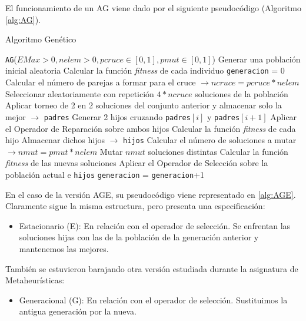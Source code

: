 El funcionamiento de un AG viene dado por el siguiente pseudocódigo (Algoritmo \ref{alg:AG}).

\begin{algorithm}
\caption{Algoritmo Genético}\label{alg:AG}
\begin{algorithmic}[1]
\Procedure \texttt{AG}($EMax > 0, nelem > 0, pcruce \in [0,1], pmut \in [0,1]$)
\State Generar una población inicial aleatoria
\State Calcular la función \textit{fitness} de cada individuo
\State \texttt{generacion} = 0
	\State Calcular el número de parejas a formar para el cruce $\xrightarrow{}{} ncruce = pcruce*nelem$
	\State Seleccionar aleatoriamente con repetición $4*ncruce$ soluciones de la población
	\State Aplicar torneo de 2 en 2 soluciones del conjunto anterior y almacenar solo la mejor $\xrightarrow{}{}$ \texttt{padres}
		\State Generar 2 hijos cruzando \texttt{padres}$[i]$ y \texttt{padres}$[i+1]$
		\State Aplicar el Operador de Reparación sobre ambos hijos
		\State Calcular la función \textit{fitness} de cada hijo
		\State Almacenar dichos hijos $\xrightarrow{}{}$ \texttt{hijos}
	\EndFor	
	\State Calcular el número de soluciones a mutar $\xrightarrow{}{} nmut = pmut*nelem$
	\State Mutar $nmut$ soluciones distintas
	\State Calcular la función \textit{fitness} de las nuevas soluciones
	\State Aplicar el Operador de Selección sobre la población actual e \texttt{hijos}
	\State \texttt{generacion} = \texttt{generacion}+1
\EndWhile
\EndProcedure
\end{algorithmic}
\end{algorithm}

En el caso de la versión AGE, su pseudocódigo viene representado en \ref{alg:AGE}. 
Claramente sigue la misma estructura, pero presenta una especificación:
\begin{itemize}
	\item Estacionario (E): En relación con el operador de selección. 
Se enfrentan las soluciones hijas con las de la población de la generación anterior y mantenemos las mejores. 
\end{itemize}
También se estuvieron barajando otra versión estudiada durante la asignatura de Metaheurísticas:
\begin{itemize}
	\item Generacional (G): En relación con el operador de selección. 
Sustituimos la antigua generación por la nueva. 
\end{itemize}

